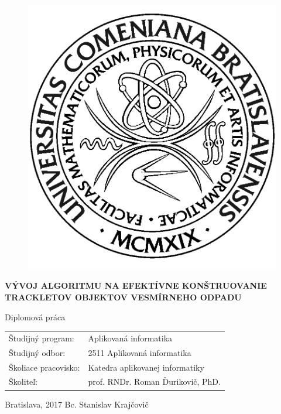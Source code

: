\documentclass[12pt, a4paper, oneside]{book}
\newcommand\mftitle{Vývoj algoritmu na efektívne \protect konštruovanie trackletov objektov vesmírneho odpadu}
\newcommand\mfthesistype{Diplomová práca}
\newcommand\mfauthor{Bc. Stanislav Krajčovič}
\newcommand\mfadvisor{prof. RNDr. Roman Ďurikovič, PhD.}
\newcommand\mfplacedate{Bratislava, 2017}
\begin{document}
\vfill
\begin{figure}[!hbt]
\begin{center}
\includegraphics{images/logo_fmph}
\label{img:logo}
\end{center}
\end{figure}
\begin{center}
\begin{minipage}{0.8\textwidth}
\centerline{\textbf{\Large\MakeUppercase{\mftitle}}}
\smallskip
\centerline{\mfthesistype}
\end{minipage}
\end{center}
\vfill
\begin{tabular}{l l}
Študijný program: & Aplikovaná informatika\\
Študijný odbor: & 2511 Aplikovaná informatika\\
Školiace pracovisko: & Katedra aplikovanej informatiky\\
Školiteľ: & \mfadvisor
\end{tabular}
\vfill
\noindent
\mfplacedate \hfill
\mfauthor
\eject 

\thispagestyle{empty}
\end{document}
